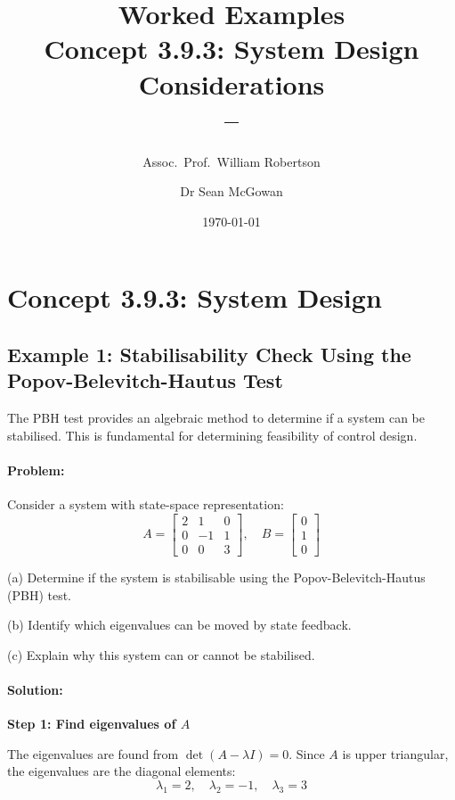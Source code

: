 \documentclass[11pt,a4paper]{article}
\title{\textbf{Worked Examples}\\[0.5em]
\large Concept 3.9.3: System Design Considerations\\[0.3em]
\normalsize \coursesubtitle{} -- \coursetitle}
\author{Assoc.\ Prof.\ William Robertson \and Dr Sean McGowan}
\date{\today}
\begin{document}
\maketitle
\tableofcontents
\newpage

\section{Concept 3.9.3: System Design}

\subsection{Example 1: Stabilisability Check Using the Popov-Belevitch-Hautus Test}

The PBH test provides an algebraic method to determine if a system can be stabilised. This is fundamental for determining feasibility of control design.

\paragraph{Problem:}
Consider a system with state-space representation:
\begin{equation}
A = \begin{bmatrix} 2 & 1 & 0 \\ 0 & -1 & 1 \\ 0 & 0 & 3 \end{bmatrix}, \quad
B = \begin{bmatrix} 0 \\ 1 \\ 0 \end{bmatrix}
\end{equation}

(a) Determine if the system is stabilisable using the Popov-Belevitch-Hautus (PBH) test.

(b) Identify which eigenvalues can be moved by state feedback.

(c) Explain why this system can or cannot be stabilised.

\paragraph{Solution:}

\textbf{Step 1: Find eigenvalues of $A$}

The eigenvalues are found from $\det(A - \lambda I) = 0$. Since $A$ is upper triangular, the eigenvalues are the diagonal elements:
\begin{equation}
\lambda_1 = 2, \quad \lambda_2 = -1, \quad \lambda_3 = 3
\end{equation}
\end{document}
